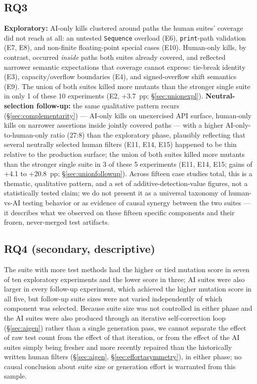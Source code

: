 \documentclass[10pt,conference]{IEEEtran}
\begin{document}
\subsection{RQ3}
\textbf{Exploratory:} AI-only kills clustered around paths the human suites' coverage did not reach at all: an untested \texttt{Sequence} overload (E6), \texttt{print}-path validation (E7, E8), and non-finite floating-point special cases (E10). Human-only kills, by contrast, occurred \emph{inside} paths both suites already covered, and reflected narrower semantic expectations that coverage cannot express: tie-break identity (E3), capacity/overflow boundaries (E4), and signed-overflow shift semantics (E9). The union of both suites killed more mutants than the stronger single suite in only 1 of these 10 experiments (E2, +3.7~pp; \S\ref{sec:unionexpl}). \textbf{Neutral-selection follow-up:} the same qualitative pattern recurs (\S\ref{sec:complementarity}) — AI-only kills on unexercised API surface, human-only kills on narrower assertions inside jointly covered paths — with a higher AI-only-to-human-only ratio (27:8) than the exploratory phase, plausibly reflecting that several neutrally selected human filters (E11, E14, E15) happened to be thin relative to the production surface; the union of both suites killed more mutants than the stronger single suite in 3 of these 5 experiments (E11, E14, E15; gains of +4.1 to +20.8~pp; \S\ref{sec:unionfollowup}). Across fifteen case studies total, this is a thematic, qualitative pattern, and a set of additive-detection-value figures, not a statistically tested claim; we do not present it as a universal taxonomy of human-vs-AI testing behavior or as evidence of causal synergy between the two suites — it describes what we observed on these fifteen specific components and their frozen, never-merged test artifacts.

\subsection{RQ4 (secondary, descriptive)}
The suite with more test methods had the higher or tied mutation score in seven of ten exploratory experiments and the lower score in three; AI suites were also larger in every follow-up experiment, which achieved the higher mutation score in all five, but follow-up suite sizes were not varied independently of which component was selected. Because suite size was not controlled in either phase and the AI suites were also produced through an iterative self-correction loop (\S\ref{sec:aigen}) rather than a single generation pass, we cannot separate the effect of raw test count from the effect of that iteration, or from the effect of the AI suites simply being fresher and more recently repaired than the historically written human filters (\S\ref{sec:aigen}, \S\ref{sec:effortasymmetry}), in either phase; no causal conclusion about suite size or generation effort is warranted from this sample.
\end{document}
